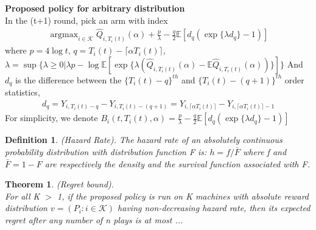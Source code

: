 \documentclass{article}
\DeclareMathOperator*{\argmax}{argmax}
\theoremstyle{plain}
\newtheorem{theo}{Theorem}
\newtheorem{defi}{Definition}
\begin{document}
\textbf{Proposed policy for arbitrary distribution}\\
In the (t+1) round, pick an arm with index 
\begin{align}
   \argmax_{i \in \mathcal{K}} \hat{Q}_{i, T_i(t)}(\alpha) + \frac{p}{\lambda} - \frac{q}{2} \mathbb{E}[d_{q} (\exp\{\lambda d_{q}\} - 1)]
\end{align}
where $p = 4 \log t$, $q = T_i(t) - \lceil \alpha T_i(t) \rceil$, $\lambda = \sup \{ \lambda \geq 0 | \lambda p - \log \mathbb{E}[\exp\{\lambda (\hat{Q}_{i, T_i(t)}(\alpha) - \mathbb{E}\hat{Q}_{i, T_i(t)}(\alpha))\}]\}$ And $d_q$ is the difference between the $\{T_i(t) - q\}^{th}$ and $\{T_i(t) - (q + 1)\}^{th}$ order statistics,
\begin{align}
    d_q = Y_{i,T_i(t) - q} - Y_{i,T_i(t) - (q + 1)} = Y_{i, \lceil \alpha T_i(t) \rceil} - Y_{i, \lceil \alpha T_i(t) \rceil - 1}
\end{align}
For simplicity, we denote $B_i(t, T_i(t), \alpha) = \frac{p}{\lambda} - \frac{q}{2} \mathbb{E}[d_{q} (\exp\{\lambda d_{q}\} - 1)]$\\

\begin{defi}
(Hazard Rate)\cite{boucheron2012}. The hazard rate of an absolutely continuous probability
distribution with distribution function F is: $h = f /\bar{F}$ where f and $\bar{F} = 1 - F$ are respectively the density and the survival function associated with F.\\
\end{defi}

\begin{theo}
(Regret bound). \\

For all K $>$ 1, if the proposed policy is run on K machines with absolute reward distribution $v = (P_i: i \in \mathcal{K})$ having non-decreasing hazard rate, then its expected regret after any number of n plays is at most ... \\
\end{theo}
\end{document}
